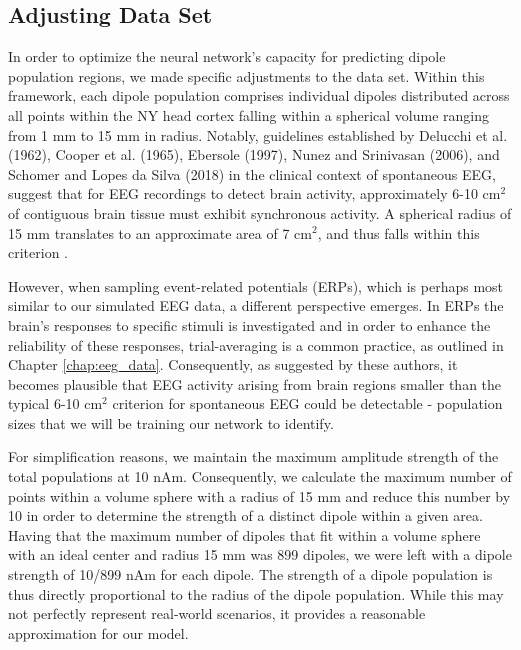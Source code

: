 \documentclass[a4paper, UKenglish, 11pt]{uiomaster}
\begin{document}
\subsection{Adjusting Data Set}
In order to optimize the neural network's capacity for predicting dipole population regions, we made specific adjustments to the data set. Within this framework, each dipole population comprises individual dipoles distributed across all points within the NY head cortex falling within a spherical volume ranging from 1 mm to 15 mm in radius. Notably, guidelines established by Delucchi et al. (1962)\cite{delucchi1962scalp}, Cooper et al. (1965)\cite{cooper1965comparison}, Ebersole (1997)\cite{ebersole1997defining}, Nunez and Srinivasan (2006)\cite{nunez2006electric}, and Schomer and Lopes da Silva (2018)\cite{niedermeyer2005electroencephalography} in the clinical context of spontaneous EEG, suggest that for EEG recordings to detect brain activity, approximately 6-10 cm$^2$ of contiguous brain tissue must exhibit synchronous activity. A spherical radius of 15 mm translates to an approximate area of 7 cm$^2$, and thus falls within this criterion \cite{nunez2019multi}.

However, when sampling event-related potentials (ERPs), which is perhaps most similar to our simulated EEG data, a different perspective emerges. In ERPs the brain's responses to specific stimuli is investigated and in order to enhance the reliability of these responses, trial-averaging is a common practice, as outlined in Chapter \ref{chap:eeg_data}. Consequently, as suggested by these authors, it becomes plausible that EEG activity arising from brain regions smaller than the typical 6-10 cm$^2$ criterion for spontaneous EEG could be detectable - population sizes that we will be training our network to identify.


For simplification reasons, we maintain the maximum amplitude strength of the total populations at 10 nAm. Consequently, we calculate the maximum number of points within a volume sphere with a radius of 15 mm and reduce this number by 10 in order to determine the strength of a distinct dipole within a given area. Having that the maximum number of dipoles that fit within a volume sphere with an ideal center and radius 15 mm was 899 dipoles, we were left with a dipole strength of 10/899 nAm for each dipole. The strength of a dipole population is thus directly proportional to the radius of the dipole population. While this may not perfectly represent real-world scenarios, it provides a reasonable approximation for our model.
\end{document}
